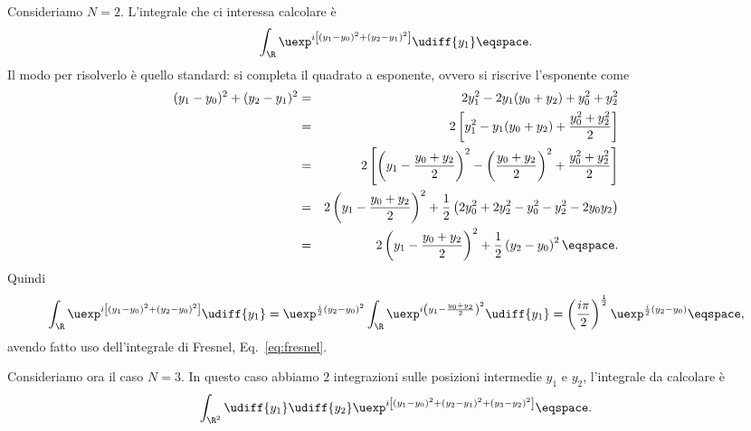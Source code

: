 Consideriamo $N=2$.  L'integrale che ci interessa calcolare \`e
\begin{displaymath}
\int_{\R} \uexp^{ i \left[ \left(y_{1} - y_{0} \right)^{2}  +
\left( y_{2} - y_{1} \right)^{2} \right] }  \udiff{y_{1}} \eqspace .
\end{displaymath}
Il modo per risolverlo \`e quello standard: si completa il quadrato a esponente,
ovvero si riscrive l'esponente come
\begin{eqnarray*}
( y_{1} - y_{0} )^{2} + (y_{2} - y_{1} )^{2} 
&=& 2 y_{1} ^{2} - 2 y_{1} (y_{0} + y_{2} ) + y_{0}^{2} + y_{2}^{2} \\
&=& 2 \left[ y_{1}^{2} - y_{1} ( y_{0} + y_{2} ) + \frac{y_{0}^{2} +
y_{2}^{2}}{2} \right] \\
&=& 2 \left[ \left( y_{1} - \frac{y_{0} + y_{2} }{2} \right)^{2} - \left(
\frac{y_{0}+y_{2}}{2} \right)^{2} + \frac{y_{0}^{2} + y_{2}^{2}}{2} \right] \\
&=& 2 \left( y_{1} - \frac{y_{0}+ y_{2} }{2} \right)^{2} + \frac{1}{2} \left(
 2 y_{0}^{2}  + 2y_{2}^{2} - y_{0}^{2} - y_{2}^{2} - 2y_{0}y_{2} \right) \\
&=& 2 \left( y_{1} - \frac{y_{0}+ y_{2} }{2} \right)^{2} + \frac{1}{2}
\left(y_{2} - y_{0} \right)^{2} \eqspace .
\end{eqnarray*}
Quindi
\begin{displaymath}
\int_{\R} \uexp^{ i \left[ \left(y_{1} - y_{0} \right)^{2}  +
\left( y_{2} - y_{0} \right)^{2} \right] }  \udiff{y_{1}} = 
\uexp^{ \frac{i}{2} \left( y_{2} - y_{0} \right)^{2}} \int_{\R} 
\uexp^{i \left( y_{1} - \frac{y_{0} + y_{2} }{2} \right)^{2} }\udiff{y_{1}} = 
\left( \frac{i\pi}{2} \right)^{\frac{1}{2}}  \uexp^{ \frac{i}{2} \left( y_{2} -
y_{0} \right)} \eqspace ,
\end{displaymath}
avendo fatto uso dell'integrale di Fresnel, Eq.~\eqref{eq:fresnel}. 
\par
Consideriamo ora il caso $N=3$. In questo caso abbiamo $2$ integrazioni sulle
posizioni intermedie $y_{1}$ e $y_{2}$,
l'integrale da calcolare \`e
\begin{displaymath}
\int_{\R^{2}} \udiff{y_{1}} \udiff{y_{2}} \uexp^{ i \left[ \left(y_{1} - y_{0}
\right)^{2} + \left( y_{2} - y_{1} \right)^{2} + \left( y_{3} - y_{2}
\right)^{2} \right]}  \eqspace .
\end{displaymath}
